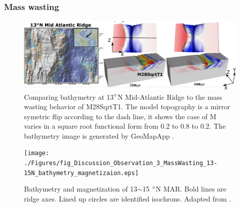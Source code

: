 \subsubsection{Mass wasting}

\begin{figure}[h]
 \centering
  \includegraphics[width=1.0\textwidth]{./Figures/fig_Discussion_Observation_1_13N_MAR_CutBack.eps}
 \caption[Comparing bathymetry at 13$\degree$N Mid-Atlantic Ridge to the mass wasting behavior of M28SqrtT1.]{Comparing bathymetry at 13$\degree$N Mid-Atlantic Ridge to the mass wasting behavior of M28SqrtT1. The model topography is a mirror symetric flip according to the dash line, it shows the case of M varies in a square root functional form from 0.2 to 0.8 to 0.2. The bathymetry image is generated by GeoMapApp \citep{Ryan2009}.}
 \label{fig_Discussion_Observation_1_13N_MAR_CutBack}
\end{figure}

\begin{figure}[h]
 \centering
  \texttt{[image: ./Figures/fig\_Discussion\_Observation\_3\_MassWasting\_13-15N\_bathymetry\_magnetizaion.eps]}
 \caption[Bathymetry and magnetization of 13$\sim$15 $\degree$N MAR.]{Bathymetry and magnetization of 13$\sim$15 $\degree$N MAR. Bold lines are ridge axes. Lined up circles are identified isochrons. Adapted from \citep{Smith2008}.}
 \label{fig_Discussion_Observation_3_MassWasting_13-15N_bathymetry_magnetizaion}
\end{figure}

